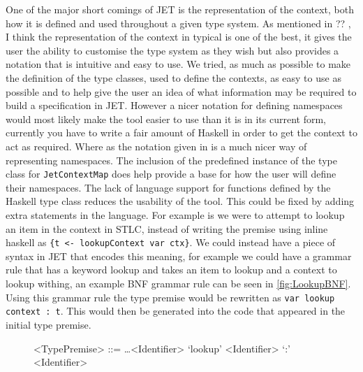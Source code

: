 One of the major short comings of JET is the representation of the context, both how it is defined and used throughout a given type system.
As mentioned in ?? , I think the representation of the context in typical is one of the best, it gives the user the ability to customise the type system as they wish but also provides a notation that is intuitive and easy to use.
We tried, as much as possible to make the definition of the type classes, used to define the contexts, as easy to use as possible and to help give the user an idea of what information may be required to build a specification in JET.
However a nicer notation for defining namespaces would most likely make the tool easier to use than it is in its current form, currently you have to write a fair amount of Haskell in order to get the context to act as required.
Where as the notation given in \textcite{grimm2007typical} is a much nicer way of representing namespaces.
The inclusion of the predefined instance of the type class for \texttt{JetContextMap} does help provide a base for how the user will define their namespaces.
The lack of language support for functions defined by the Haskell type class reduces the usability of the tool.
This could be fixed by adding extra statements in the language.
For example is we were to attempt to lookup an item in the context in STLC, instead of writing the premise using inline haskell as \texttt{\{t <- lookupContext var ctx\}}.
We could instead have a piece of syntax in JET that encodes this meaning, for example we could have a grammar rule that has a keyword lookup and takes an item to lookup and a context to lookup withing, an example BNF grammar rule can be seen in \autoref{fig:LookupBNF}.
Using this grammar rule the type premise would be rewritten as \texttt{var lookup context : t}.
This would then be generated into the code that appeared in the initial type premise.

\begin{figure}[]
    \centering
    \begin{grammar}
        <TypePremise> ::= \dots \alt <Identifier> `lookup' <Identifier> `:' <Identifier>
    \end{grammar}
    \caption{}
    \label{fig:LookupBNF}
\end{figure}

